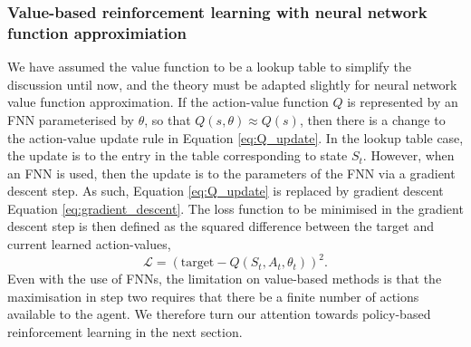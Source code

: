 \subsubsection{Value-based reinforcement learning with neural network function approximiation}
\label{sec:value_rl_fnn}
We have assumed the value function to be a lookup table to simplify the discussion until now, and the theory must be adapted slightly for neural network value function approximation.
If the action-value function $Q$ is represented by an FNN parameterised by $\theta$, so that $Q(s, \theta) \approx Q(s)$, 
then there is a change to the action-value update rule in Equation \ref{eq:Q_update}. In the lookup table case, the update is to the entry in the table corresponding to state $S_t$. However, when an FNN is used, then the update is to the parameters of the FNN via a gradient descent step. As such, Equation \ref{eq:Q_update} is replaced by gradient descent Equation \ref{eq:gradient_descent}. The loss function to be minimised in the gradient descent step is then defined as the squared difference between the target and current learned action-values,
\begin{equation}
    \mathcal{L} = (\text{target} - Q(S_t, A_t,\theta_t))^2. 
\end{equation}
Even with the use of FNNs, the limitation on value-based methods is that the maximisation in step two requires that there be a finite number of actions available to the agent. We therefore turn our attention towards policy-based reinforcement learning in the next section.

